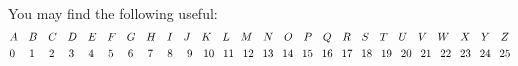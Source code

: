 \documentclass[11pt,addpoints,letterpaper]{exam}
\begin{document}
{\centering

\\[2em]
You may find the following useful:
\begin{align*}
&A\hspace{.35cm} B\hspace{.35cm}C\hspace{.35cm}D\hspace{.35cm}E\hspace{.35cm}F\hspace{.35cm}G\hspace{.35cm}H\hspace{.35cm}I\hspace{.35cm}J\hspace{.35cm}K\hspace{.35cm}L\hspace{.35cm}M\hspace{.35cm}N\hspace{.35cm}O\hspace{.35cm}P\hspace{.35cm}Q\hspace{.35cm}R\hspace{.35cm}S\hspace{.35cm}T\hspace{.35cm}U\hspace{.35cm}V\hspace{.35cm}W\hspace{.35cm}X\hspace{.35cm}Y\hspace{.35cm}Z\\
&0\hspace{.46cm} 1\hspace{.46cm} 2\hspace{.46cm} 3\hspace{.46cm} 4\hspace{.46cm} 5\hspace{.46cm} 6\hspace{.46cm} 7\hspace{.46cm} 8\hspace{.46cm} 9\hspace{.35cm} 10\hspace{.285cm} 11\hspace{.285cm} 12\hspace{.285cm} 13\hspace{.285cm} 14\hspace{.285cm} 15\hspace{.285cm}16\hspace{.285cm}17\hspace{.285cm}18\hspace{.285cm}19\hspace{.285cm}20\hspace{.285cm}21\hspace{.285cm}22\hspace{.285cm}23\hspace{.285cm}24\hspace{.285cm}25
\end{align*}
}
\end{document}
